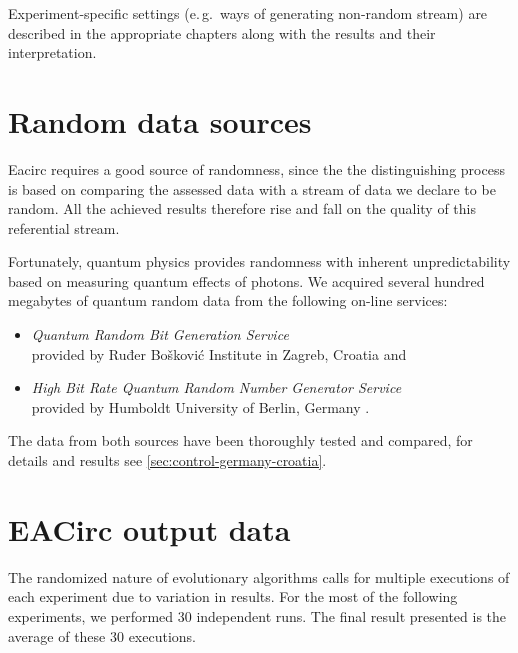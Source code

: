 \documentclass[12pt,oneside]{fithesis2}		%
\renewcommand{\_}{\leavevmode \kern0.0em\vbox{\hrule width0.4em}}
\newcommand{\squarebullet}{\textcolor{black}{\raisebox{0.15em}{\rule{4pt}{4pt}}}}
\newenvironment{myItemize}{
  \begin{itemize}[leftmargin=2em,rightmargin=1em,itemsep=\parskip ,parsep=0em,topsep=0em,partopsep=0em]
  \renewcommand{\labelitemi}{\squarebullet}
  \renewcommand{\labelitemii}{$\diamond$}
}{
  \end{itemize}
}
\begin{document}
Experiment-specific settings (e.\,g.\ ways of generating non-random stream) are described in the 
appropriate chapters along with the results and their interpretation.

\section{Random data sources}
\label{sec:settings-random}

Eacirc requires a good source of randomness, since the the distinguishing process is based on comparing the assessed data
with a stream of data we declare to be random. All the achieved results therefore rise and fall 
on the quality of this referential stream.

Fortunately, quantum physics provides randomness with inherent unpredictability based on measuring quantum effects of photons. 
We acquired several hundred megabytes of quantum random data from the following on-line services:
\begin{myItemize}
\item \textit{Quantum Random Bit Generation Service}\\
provided by Ruđer Bošković Institute in Zagreb, Croatia \parencite{qrng-service-croatia} and
\item \textit{High Bit Rate Quantum Random Number Generator Service}\\
provided by Humboldt University of Berlin, Germany \parencite{qrng-service-germany}.
\end{myItemize}
The data from both sources have been thoroughly tested and compared, for details and results 
see \autoref{sec:control-germany-croatia}.

\section{EACirc output data}
\label{sec:settings-eacirc-output}

The randomized nature of evolutionary algorithms calls for multiple executions of each experiment due to variation in results.
For the most of the following experiments, we performed 30 independent runs. The final result presented is the average
of these 30 executions.
\end{document}
